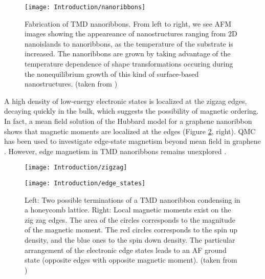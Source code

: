 \begin{figure}[H]
\centering
\texttt{[image: Introduction/nanoribbons]}
\caption[Fabrication of \ac{TMD} nanoribbons]{Fabrication of \ac{TMD} nanoribbons. From left to right, we see \ac{AFM} images showing the appeareance of nanostructures ranging from \ac{2D} nanoislands to nanoribbons, as the temperature of the substrate is increased. The nanoribbons are grown by taking advantage of the temperature dependence of shape transformations occuring during the nonequilibrium growth of this kind of surface-based nanostructures. (taken from \cite{chen_fabrication_2017})}
\label{fig:fabrication}
\end{figure}
   
A high density of low-energy electronic states is localized at the zigzag edges, decaying quickly in the bulk, which suggests the possibility of magnetic ordering.
In fact, a mean field solution of the Hubbard model for a graphene nanoribbon shows that magnetic moments are localized at the edges \cite{yazyev_emergence_2010} (Figure \ref{fig:nanoribbons}, right).
QMC has been used to investigate edge-state magnetism beyond mean field in graphene \cite{feldner_dynamical_2011, golor_quantum_2013, cheng_strain-induced_2015, raczkowski_interplay_2017, yang_strain-tuning_2017}.
However, edge magnetism in TMD nanoribbons remains unexplored \cite{davelou_nanoribbon_2017}.
 
\begin{figure}[H]
\hspace{2cm}
\begin{minipage}[c]{0.1\textwidth}
\texttt{[image: Introduction/zigzag]}
\end{minipage} \hspace{6cm}
\begin{minipage}[c]{0.1\textwidth}
\texttt{[image: Introduction/edge\_states]}
\end{minipage}
 \caption[Zigzag edges of a nanoribbon and magnetism.]{Left: Two possible terminations of a \ac{TMD} nanoribbon condensing in a honeycomb lattice.
Right: Local magnetic moments exist on the zig zag edges.
The area of the circles corresponds to the magnitude of the magnetic moment.
The red circles corresponds to the spin up density, and the blue ones to the spin down density.
The particular arrangement of the electronic edge states leads to an \ac{AF} ground state (opposite edges with opposite magnetic moment). (taken from \cite{yazyev_emergence_2010}) \label{fig:nanoribbons}}
\end{figure}

